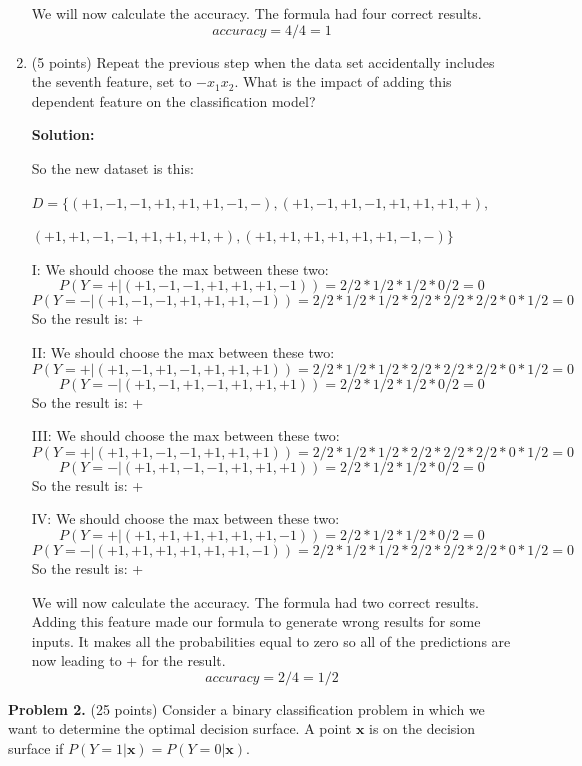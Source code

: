 \documentclass[twoside]{article}
\begin{document}
\begin{enumerate}
We will now calculate the accuracy. The formula had four correct results.
\[
accuracy  = 4 / 4 = 1
\]

\item (5 points) Repeat the previous step when the data set accidentally includes the seventh feature, set to $-x_{1}x_{2}$. What is the impact of adding this dependent feature on the classification model?

\textbf{Solution:}

So the new dataset is this:

$D = \{
(+1,-1,-1,+1,+1,+1,-1,-),
(+1,-1,+1,-1,+1,+1,+1,+),
$

$
(+1,+1,-1,-1,+1,+1,+1,+),
(+1,+1,+1,+1,+1,+1,-1,-)
\}
$


I: We should choose the max between these two:
\[
P(Y=+|(+1,-1,-1,+1,+1,+1,-1)) = 2/2 * 1/2 * 1/2 * 0/2 = 0
\]
\[
P(Y=-|(+1,-1,-1,+1,+1,+1,-1)) = 2/2*1/2*1/2*2/2*2/2*2/2 * 0 *1/2 = 0
\]
So the result is: +

II: We should choose the max between these two:
\[
P(Y=+|(+1,-1,+1,-1,+1,+1,+1)) = 2/2*1/2*1/2*2/2*2/2*2/2*0 *1/2 = 0
\]
\[
P(Y=-|(+1,-1,+1,-1,+1,+1,+1)) = 2/2 * 1/2 * 1/2 * 0/2 = 0
\]
So the result is: +

III: We should choose the max between these two:
\[
P(Y=+|(+1,+1,-1,-1,+1,+1,+1)) = 2/2*1/2*1/2*2/2*2/2*2/2*0 *1/2 = 0
\]
\[
P(Y=-|(+1,+1,-1,-1,+1,+1,+1)) = 2/2 * 1/2 * 1/2 * 0/2 = 0
\]
So the result is: +

IV: We should choose the max between these two:
\[
P(Y=+|(+1,+1,+1,+1,+1,+1,-1)) = 2/2 * 1/2 * 1/2 * 0/2 = 0
\]
\[
P(Y=-|(+1,+1,+1,+1,+1,+1,-1)) = 2/2*1/2*1/2*2/2*2/2*2/2*0 *1/2 = 0
\]
So the result is: +


We will now calculate the accuracy. The formula had two correct results. Adding this feature made our formula to generate wrong results for some inputs. It makes all the probabilities equal to zero so all of the predictions are now leading to + for the result.
\[
accuracy  = 2 / 4 = 1/2
\]

\end{enumerate}


\textbf{Problem 2.} (25 points) Consider a binary classification problem in which we want to determine the optimal decision surface. A point $\mathbf{x}$ is on the decision surface if $P(Y=1|\mathbf{x})=P(Y=0|\mathbf{x})$.
\end{document}
